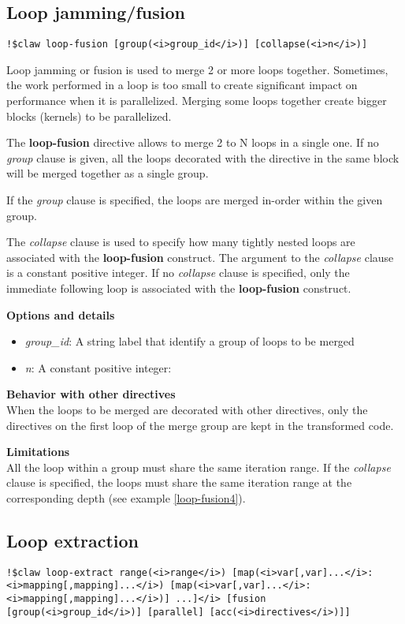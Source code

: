 \documentclass{article}
\begin{document}
\subsection{Loop jamming/fusion}
\begin{lstlisting}
!$claw loop-fusion [group(<i>group_id</i>)] [collapse(<i>n</i>)]
\end{lstlisting}

Loop jamming or fusion is used to merge 2 or more loops together. Sometimes, the
work performed in a loop is too small to create significant impact on
performance when it is parallelized. Merging some loops together create bigger
blocks (kernels) to be parallelized.

The \textbf{loop-fusion} directive allows to merge 2 to N loops in a single one. If
no \textit{group} clause is given, all the loops decorated with the directive in the
same block will be merged together as a single group.

If the \textit{group} clause is specified, the loops are merged in-order within the
given group.

The \textit{collapse} clause is used to specify how many tightly nested loops are
associated with the \textbf{loop-fusion} construct. The argument to the \textit{collapse}
clause is a constant positive integer. If no \textit{collapse} clause
is specified, only the immediate following loop is associated with the
\textbf{loop-fusion} construct.

\textbf{Options and details}
\begin{itemize}
\item \textit{group\_id}: A string label that identify a group of loops to be merged
\item \textit{n}: A constant positive integer:
\end{itemize}

\textbf{Behavior with other directives}\\
When the loops to be merged are decorated with other directives, only the
directives on the first loop of the merge group are kept in the transformed
code.

\textbf{Limitations}\\
All the loop within a group must share the same iteration range. If the
\textit{collapse} clause is specified, the loops must share the same iteration range at the
corresponding depth (see example \ref{loop-fusion4}).

\subsection{Loop extraction}
\begin{lstlisting}
!$claw loop-extract range(<i>range</i>) [map(<i>var[,var]...</i>:<i>mapping[,mapping]...</i>) [map(<i>var[,var]...</i>:<i>mapping[,mapping]...</i>)] ...]</i> [fusion [group(<i>group_id</i>)] [parallel] [acc(<i>directives</i>)]]
\end{lstlisting}
\end{document}
